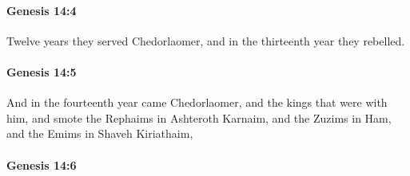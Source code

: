 
		\paragraph{Genesis 14:4} %
			\label{GENESIS-14-4}

			Twelve years they served Chedorlaomer, and in the thirteenth year they rebelled.


		\paragraph{Genesis 14:5} %
			\label{GENESIS-14-5}

			And in the fourteenth year came Chedorlaomer, and the kings that were with him, and smote the Rephaims in Ashteroth Karnaim, and the Zuzims in Ham, and the Emims in Shaveh Kiriathaim,


		\paragraph{Genesis 14:6} %
			\label{GENESIS-14-6}

